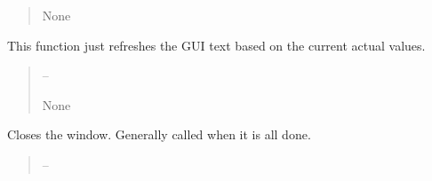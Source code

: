 \documentclass[letterpaper,11pt,english]{sphinxmanual}
\begin{document}
\begin{savenotes}
\begin{fulllineitems}
\begin{savenotes}
\begin{fulllineitems}
\begin{quote}
\begin{description}
\sphinxAtStartPar
None

\end{description}\end{quote}

\end{fulllineitems}\end{savenotes}


\begin{savenotes}\begin{fulllineitems}
\label{\detokenize{code/opihiexarata.gui.selector:opihiexarata.gui.selector.TargetSelectorWindow._refresh_text}}
\pysigstartsignatures
{}
\pysigstopsignatures
\sphinxAtStartPar
This function just refreshes the GUI text based on the current
actual values.
\begin{quote}\begin{description}
\sphinxAtStartPar
{} – 

\sphinxAtStartPar
None

\end{description}\end{quote}

\end{fulllineitems}\end{savenotes}


\begin{savenotes}\begin{fulllineitems}
\label{\detokenize{code/opihiexarata.gui.selector:opihiexarata.gui.selector.TargetSelectorWindow.close_window}}
\pysigstartsignatures
{}
\pysigstopsignatures
\sphinxAtStartPar
Closes the window. Generally called when it is all done.
\begin{quote}\begin{description}
\sphinxAtStartPar
{} – 


\end{description}
\end{quote}
\end{fulllineitems}
\end{savenotes}
\end{fulllineitems}
\end{savenotes}
\end{document}

